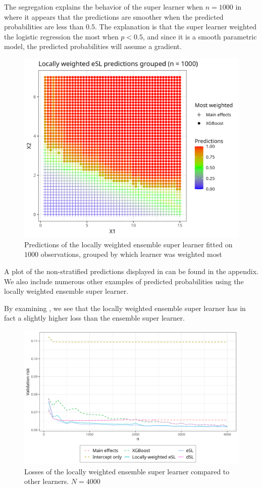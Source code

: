 \documentclass[./main.tex]{subfiles}
\begin{document}
The segregation explains the behavior of the super learner when $ n = 1000 $ in  where it appears that the predictions are smoother when the predicted probabilities are less than $ 0.5 $. The explanation is that the super learner weighted the logistic regression the most when $ p < 0.5 $, and since it is a smooth parametric model, the predicted probabilities will assume a gradient. 
\begin{figure}[H]
    \centering
    \includegraphics[width=\textwidth]{figures/esl_preds_lw_stratified.png}
    \caption{Predictions of the locally weighted ensemble super learner fitted on $ 1000 $ observations, grouped by which learner was weighted most}
    \label{fig:esl_preds_lw_stratified}
\end{figure}
A plot of the non-stratified predictions displayed in  can be found in the appendix. We also include numerous other examples of predicted probabilities using the locally weighted ensemble super learner.

By examining , we see that the locally weighted ensemble super learner has in fact a slightly higher loss than the ensemble super learner.
\begin{figure}[H]
    \centering
    \includegraphics[width=\textwidth]{figures/losses_esl_lw.png}
    \caption{Losses of the locally weighted ensemble super learner compared to other learners. $ N = 4000 $}
    \label{fig:losses_esl_lw}
\end{figure}
\end{document}
